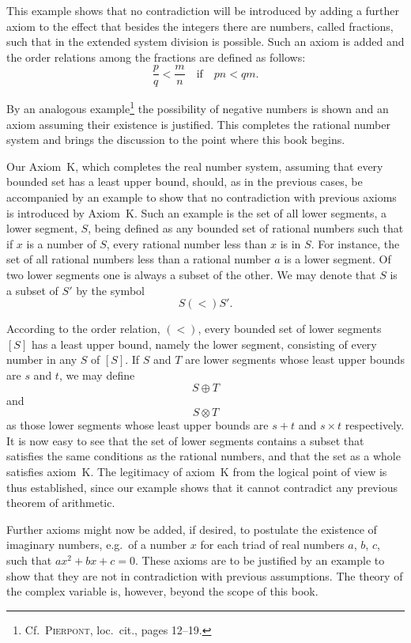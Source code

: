 \documentclass[a4paper,12pt]{book}[2004/02/16]
\providecommand{\olessthan}{(<)}
\providecommand{\hyperlink}[2]{#2}
\theoremstyle{ilemma}
\theoremstyle{itheorem}
\theoremstyle{iother}
\theoremstyle{icorollary}
\theoremstyle{numcorollary}
\theoremstyle{idefinition}
\begin{document}
This example shows that no contradiction will be introduced by adding
a further axiom to the effect that besides the integers there are
numbers, called fractions, such that in the extended system division
is possible. Such an axiom is added and the order relations among the
fractions are defined as follows:
\[
  \frac pq <\frac mn\quad \text{if}\quad pn<qm.
\]

By an analogous example\footnote{%
  Cf.\ \textsc{Pierpont}, loc.\ cit., pages 12--19.}
the possibility of negative numbers is shown and an axiom assuming
their existence is justified.  This completes the rational number
system and brings the discussion to the point where this book begins.

Our \hyperlink{axiomK}{Axiom~K}, which completes the real number system, assuming that
every bounded set has a least upper bound, should, as in the previous
cases, be accompanied by an example to show that no contradiction with
previous axioms is introduced by \hyperlink{axiomK}{Axiom~K}. Such an example is the set
of all lower segments, a lower segment, $S$, being defined as any
bounded set of rational numbers such that if $x$ is a number of $S$,
every rational number less than $x$ is in $S$. For instance, the set
of all rational numbers less than a rational number $a$ is a lower
segment. Of two lower segments one is always a subset of the other. We
may denote that $S$ is a subset of $S'$ by the symbol
\[
  S \olessthan S'.
\]

According to the order relation, $\olessthan$, every bounded set of
lower segments $[S]$ has a least upper bound, namely the lower
segment, consisting of every number in any $S$ of $[S]$. If $S$ and
$T$ are lower segments whose least upper bounds are $s$ and $t$, we
may define
\[
  S \oplus T
\]
and
\[
  S \otimes T
\]
as those lower segments whose least upper bounds are $s+t$ and $s
\times t$ respectively. It is now easy to see that the set of lower
segments contains a subset that satisfies the same conditions as the
rational numbers, and that the set as a whole satisfies \hyperlink{axiomK}{axiom~K}\@. The
legitimacy of \hyperlink{axiomK}{axiom~K} from the logical point of view is thus
established, since our example shows that it cannot contradict any
previous theorem of arithmetic.

Further axioms might now be added, if desired, to postulate the
existence of imaginary numbers, e.g.\ of a number $x$ for
each triad of real numbers $a$, $b$, $c$, such that $ax^2 + bx +
c=0$.  These axioms are to be justified by an example to show that
they are not in contradiction with previous assumptions. The theory of
the complex variable is, however, beyond the scope of this book.
\end{document}
